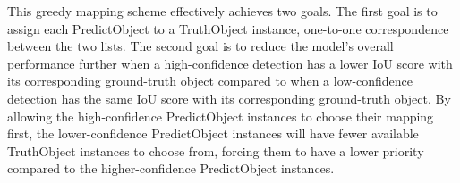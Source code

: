This greedy mapping scheme effectively achieves two goals. The first goal is to assign each PredictObject to a  TruthObject instance, one-to-one correspondence between the two lists. The second goal is to reduce the model's overall performance further when a high-confidence detection has a lower IoU score with its corresponding ground-truth object compared to when a low-confidence detection has the same IoU score with its corresponding ground-truth object. By allowing the high-confidence PredictObject instances to choose their mapping first, the lower-confidence PredictObject instances will have fewer available TruthObject instances to choose from, forcing them to have a lower priority compared to the higher-confidence PredictObject instances.